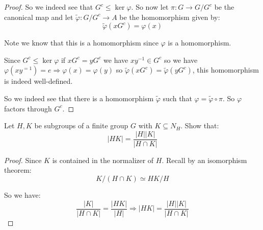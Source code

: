 \begin{exercise}
\begin{proof}
So we indeed see that $G^c\leq \ker \varphi$. So now let $\pi \colon G\rightarrow G/G^c$ be the canonical map and let $\tilde{\varphi}\colon G/G^c \rightarrow A$ be the homomorphism given by:\begin{equation*}
\tilde{\varphi}(xG^c) =\varphi(x) 
\end{equation*}

Note we know that this is a homomorphism since $\varphi$ is a homomorphism.

Since $G^c \leq \ker\varphi$ if $xG^c = yG^c$ we have $xy^{-1}\in G^c$ so we have $\varphi(xy^{=1}) = e \Rightarrow \varphi(x) = \varphi(y)$ so $\tilde{\varphi}(xG^c) = \tilde{\varphi}(yG^c)$, this homomorphism is indeed well-defined.

So we indeed see that there is a homomorphism $\tilde{\varphi}$ such that $\varphi = \tilde{\varphi}\circ \pi$. So $\varphi$ factors through $G^c$.
\end{proof}
\end{exercise}

\begin{exercise}
Let $H,K$ be subgroups of a finite group $G$ with $K\subseteq N_H$. Show that:\[|HK| = \frac{|H||K|}{|H\cap K|} \]
\begin{proof}
Since $K$ is contained in the normalizer of $H$. Recall by an isomorphism theorem:\[K/(H\cap K) \simeq HK/H \]

So we have:\begin{equation*}
\frac{|K|}{|H\cap K|} = \frac{|HK|}{|H|} \Rightarrow |HK| = \frac{|H||K|}{|H\cap K|}
\end{equation*}

\end{proof}
\end{exercise}

